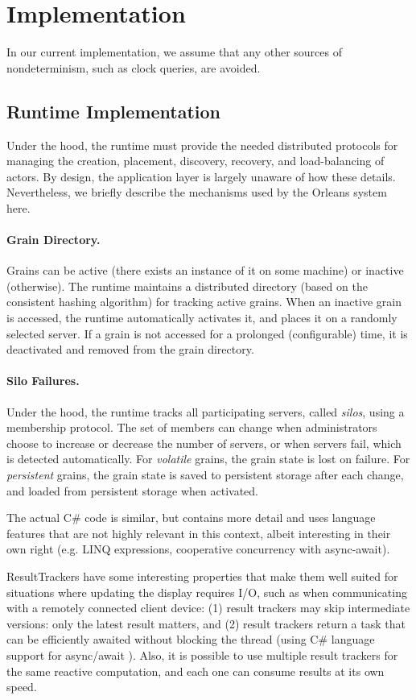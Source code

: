 \section{Implementation}

In our current implementation, we assume that any other sources of nondeterminism, such as clock queries, are avoided.



\subsection{Runtime Implementation}

Under the hood, the runtime must provide the needed distributed protocols for managing the creation, placement, discovery, recovery, and load-balancing of actors. By design, the application layer is largely unaware of how these details. Nevertheless, we briefly describe the mechanisms used by the Orleans system here. 

\paragraph{Grain Directory.} Grains can be active (there exists an instance of it on some machine) or inactive (otherwise). The runtime maintains a distributed directory (based on the consistent hashing algorithm)  for tracking active grains. When an inactive grain is accessed, the runtime automatically activates it, and places it on a randomly selected server. If a grain is not accessed for a prolonged (configurable) time, it is deactivated and removed from the grain directory. 

\paragraph{Silo Failures.} Under the hood, the runtime tracks all participating servers, called \emph{silos}, using a membership protocol. The set of members can change when administrators choose to increase or decrease the number of servers, or when servers fail, which is detected automatically.  For \emph{volatile} grains, the grain state is lost on failure. For \emph{persistent} grains, the grain state is saved to persistent storage after each change, and loaded from persistent storage when activated. 
 

The actual C\# code is similar, but contains more detail and uses language features that are not highly relevant in this context, albeit interesting in their own right (e.g. LINQ expressions, cooperative concurrency with async-await).

ResultTrackers have some interesting properties that make them well suited for situations where updating the display requires I/O, such as when communicating with a remotely connected client device:   (1) result trackers may skip intermediate versions: only the latest result matters, and (2) result trackers return a task that can be efficiently awaited without blocking the thread (using C\# language support for async/await \cite{Bierman2012}).  Also, it is possible to use multiple result trackers for the same reactive computation, and each one can consume results at its own speed.
